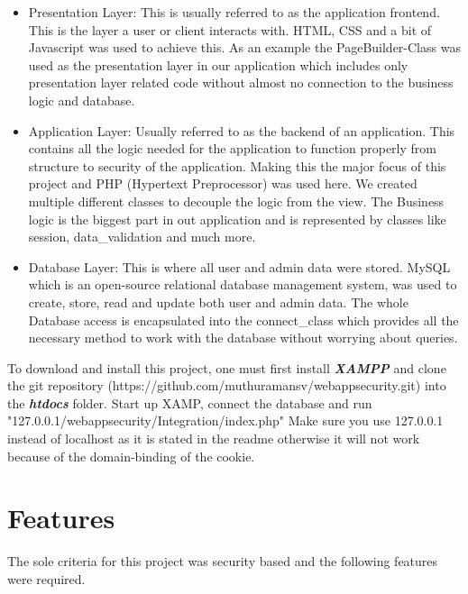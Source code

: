 \documentclass[12pt,a4paper]{article}
\begin{document}
	\begin{itemize}
		
		\item 	Presentation Layer: This is usually referred to as the application frontend. This is the layer a user or client interacts with. HTML, CSS and a bit of Javascript was used to achieve this. As an example the PageBuilder-Class was used as the presentation layer in our application which includes only presentation layer related code without almost no connection to the business logic and database.
		
		\item Application Layer: Usually referred to as the backend of an application. This contains all the logic needed for the application to function properly from structure to security of the application. Making this the major focus of this project and PHP (Hypertext Preprocessor) was used here.  We created multiple different classes to decouple the logic from the view.  The Business logic is the biggest part in out application and is represented by classes like session, data\_validation and much more.
		
		\item Database Layer: This is where all user and admin data were stored. MySQL which is an open-source relational database management system, was used to create, store, read and update both user and admin data. The whole Database access is encapsulated into the connect\_class which provides all the necessary method to work with the database without worrying about queries.
		
	\end{itemize}
	
	To download and install this project, one must first install \textbf{\textit{XAMPP}} and clone the git repository (https://github.com/muthuramansv/webappsecurity.git) into the \textbf{\textit{htdocs}} folder. Start up XAMP, connect the database and run "127.0.0.1/webappsecurity/Integration/index.php" Make sure you use 127.0.0.1 instead of localhost as it is stated in the readme otherwise it will not work because of the domain-binding of the cookie.
	
	
	
	\section{Features}
	
	The sole criteria for this project was security based and the following features were required.
	
\end{document}
